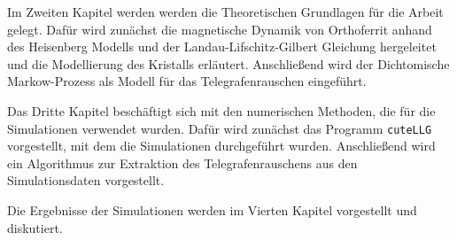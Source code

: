 \documentclass[main.tex]{subfiles}
\begin{document}
Im Zweiten Kapitel werden werden die Theoretischen Grundlagen für die Arbeit gelegt. Dafür wird zunächst die magnetische Dynamik von Orthoferrit anhand des Heisenberg Modells und der Landau-Lifschitz-Gilbert Gleichung hergeleitet und die Modellierung des  Kristalls erläutert.
Anschließend wird der Dichtomische Markow-Prozess als Modell für das Telegrafenrauschen eingeführt.

Das Dritte Kapitel beschäftigt sich mit den numerischen Methoden, die für die Simulationen verwendet wurden. Dafür wird zunächst das Programm \texttt{cuteLLG} vorgestellt, mit dem die Simulationen durchgeführt wurden. Anschließend wird ein Algorithmus zur Extraktion des Telegrafenrauschens aus den Simulationsdaten vorgestellt.

Die Ergebnisse der Simulationen werden im Vierten Kapitel vorgestellt und diskutiert. 

\end{document}
